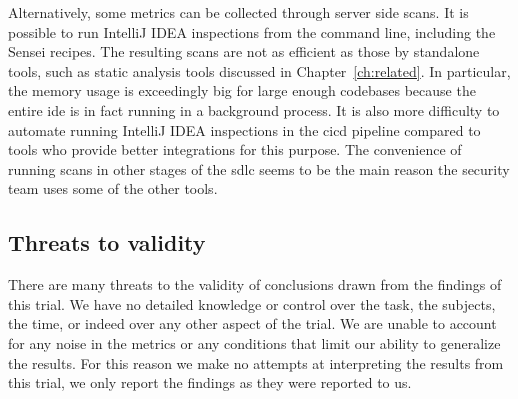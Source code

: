 Alternatively, some metrics can be collected through server side scans.
It is possible to run IntelliJ IDEA inspections from the command line, including the Sensei recipes. 
The resulting scans are not as efficient as those by standalone tools, such as static analysis tools discussed in Chapter~\ref{ch:related}.
In particular, the memory usage is exceedingly big for large enough codebases because the entire \gls{ide} is in fact running in a background process.
It is also more difficulty to automate running IntelliJ IDEA inspections in the \gls{cicd} pipeline compared to tools who provide better integrations for this purpose.
The convenience of running scans in other stages of the \gls{sdlc} seems to be the main reason the security team uses some of the other tools.

%
%
%
\subsection{Threats to validity}
There are many threats to the validity of conclusions drawn from the findings of this trial. We have no detailed knowledge or control over the task, the subjects, the time, or indeed over any other aspect of the trial. We are unable to account for any noise in the metrics or any conditions that limit our ability to generalize the results. For this reason we make no attempts at interpreting the results from this trial, we only report the findings as they were reported to us.